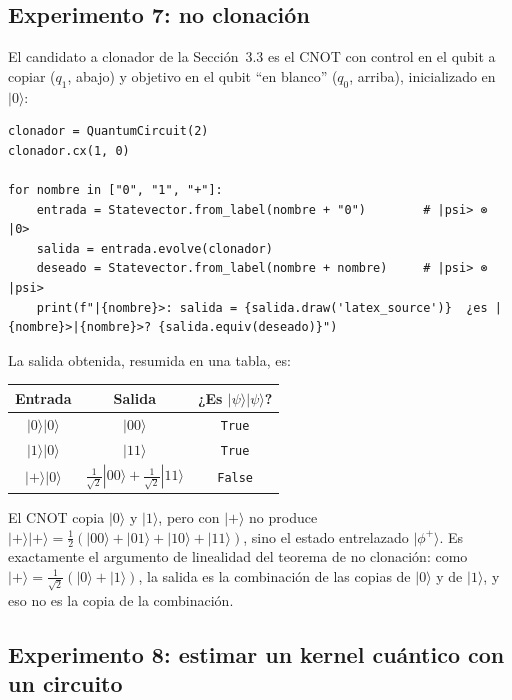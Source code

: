 \documentclass[11pt, a4paper, twoside, openright]{report}
\begin{document}
\subsection{Experimento 7: no clonación}

\noindent El candidato a clonador de la Sección~3.3 es el CNOT con control en el qubit a copiar ($q_1$, abajo) y objetivo en el qubit ``en blanco'' ($q_0$, arriba), inicializado en $|0\rangle$:
\begin{lstlisting}
clonador = QuantumCircuit(2)
clonador.cx(1, 0)

for nombre in ["0", "1", "+"]:
    entrada = Statevector.from_label(nombre + "0")        # |psi> ⊗ |0>
    salida = entrada.evolve(clonador)
    deseado = Statevector.from_label(nombre + nombre)     # |psi> ⊗ |psi>
    print(f"|{nombre}>: salida = {salida.draw('latex_source')}  ¿es |{nombre}>|{nombre}>? {salida.equiv(deseado)}")
\end{lstlisting}
\noindent La salida obtenida, resumida en una tabla, es:
\begin{center}
\renewcommand{\arraystretch}{1.3}
\begin{tabular}{c|c|c}
\textbf{Entrada} & \textbf{Salida} & \textbf{¿Es $|\psi\rangle|\psi\rangle$?} \\ \hline
$|0\rangle|0\rangle$ & $|00\rangle$ & \texttt{True} \\
$|1\rangle|0\rangle$ & $|11\rangle$ & \texttt{True} \\
$|+\rangle|0\rangle$ & $\frac{1}{\sqrt2}|00\rangle + \frac{1}{\sqrt2}|11\rangle$ & \texttt{False}
\end{tabular}
\end{center}
\noindent El CNOT copia $|0\rangle$ y $|1\rangle$, pero con $|+\rangle$ no produce $|+\rangle|+\rangle = \frac12(|00\rangle + |01\rangle + |10\rangle + |11\rangle)$, sino el estado entrelazado $|\phi^+\rangle$. Es exactamente el argumento de linealidad del teorema de no clonación: como $|+\rangle = \frac{1}{\sqrt2}(|0\rangle + |1\rangle)$, la salida es la combinación de las copias de $|0\rangle$ y de $|1\rangle$, y eso no es la copia de la combinación.

\subsection{Experimento 8: estimar un kernel cuántico con un circuito}
\end{document}
